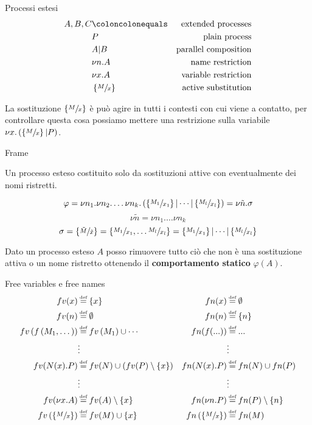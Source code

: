 \begin{frame}{Processi estesi}
  \begin{align*}
    A,B,C & \coloncolonequals & \text{extended processes} \\
          & P & \text{plain process} \\
          & A | B & \text{parallel composition} \\
          & \nu n.A & \text{name restriction} \\
          & \nu x.A & \text{variable restriction} \\
          & \left\{ \sfrac{M}{x} \right\} & \text{active substitution}
  \end{align*}
  
  La sostituzione $\left\{ \sfrac{M}{x} \right\}$ \`e pu\`o agire in
  tutti i contesti con cui viene a contatto, per controllare questa cosa
  possiamo mettere una restrizione sulla variabile $\nu x.\left( \left\{
      \sfrac{M}{x} \right\} | P\right)$.
\end{frame}

\begin{frame}{Frame}
  \begin{mydef}[Frame]
    Un processo esteso costituito solo da sostituzioni attive con
    eventualmente dei nomi ristretti.
  \end{mydef}
  \[ \varphi = \nu n_1.\nu n_2.\dots \nu n_k . \left( \left\{
        \sfrac{M_1}{x_1}\right\}| \cdots | \left\{\sfrac{M_l}{x_l}\right\}\right) = \nu
    \tilde n. \sigma \]
  \[ \nu \tilde n = \nu n_1. \dots \nu n_k \]
  \[ \sigma = \left\{ \sfrac{\tilde M}{\tilde x}\right\} = \left\{
      \sfrac{M_1}{x_1}, \dots \sfrac{M_l}{x_l}\right\} = \left\{
      \sfrac{M_1}{x_1}\right\}| \cdots | \left\{\sfrac{M_l}{x_l}\right\} \]
  \vfill

  Dato un processo esteso $A$ posso rimuovere tutto ci\`o che non \`e
  una sostituzione attiva o un nome ristretto ottenendo il
  \textbf{comportamento statico} $\varphi(A)$.
\end{frame}

\begin{frame}{Free variables e free names}
  \begin{align*}
    fv(x) & \eqdef \set{x} & fn(x) & \eqdef \emptyset \\
    fv(n) & \eqdef \emptyset &  fn(n) & \eqdef \set{n} \\
    fv\pa{f\pa{ M_1, \dots }} & \eqdef fv\pa{M_1} \cup \cdots  & fn(f(...)) & \eqdef ... \\
          & \vdots & &\vdots  \\
    fv(N(x).P) & \eqdef fv(N) \cup \pa{fv(P) \setminus \set{x}} &   fn(N(x).P) & \eqdef fn(N) \cup fn(P) \\
          & \vdots & & \vdots \\
    fv(\nu x.A) & \eqdef fv(A) \setminus \set{x} &   fn(\nu n.P) & \eqdef fn(P)\setminus \set{n} \\
    fv\pa{ \set{ \sfrac{M}{x} } } & \eqdef fv(M) \cup \set{x} & fn\pa{ \set{ \sfrac{M}{x} } } & \eqdef fn(M) \\
  \end{align*}
\end{frame}

